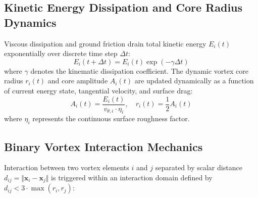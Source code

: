 \documentclass[11pt, a4paper]{article}
\begin{document}
\subsection{Kinetic Energy Dissipation and Core Radius Dynamics}

Viscous dissipation and ground friction drain total kinetic energy $E_i(t)$ exponentially over discrete time step $\Delta t$:
\begin{equation}
E_i(t + \Delta t) = E_i(t) \exp\left(-\gamma \Delta t\right)
\end{equation}
where $\gamma$ denotes the kinematic dissipation coefficient. The dynamic vortex core radius $r_i(t)$ and core amplitude $A_i(t)$ are updated dynamically as a function of current energy state, tangential velocity, and surface drag:
\begin{equation}
A_i(t) = \frac{E_i(t)}{v_{\theta, i} \cdot \eta_i}, \quad r_i(t) = \frac{1}{2} A_i(t)
\end{equation}
where $\eta_i$ represents the continuous surface roughness factor.

\subsection{Binary Vortex Interaction Mechanics}

Interaction between two vortex elements $i$ and $j$ separated by scalar distance $d_{ij} = \Vert\mathbf{x}_i - \mathbf{x}_j\Vert$ is triggered within an interaction domain defined by $d_{ij} < 3 \cdot \max(r_i, r_j)$:
\end{document}
